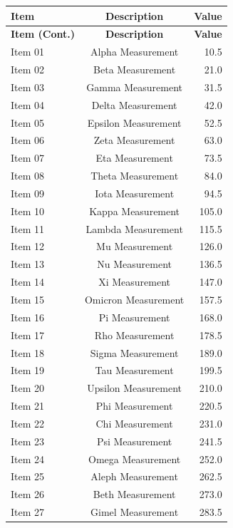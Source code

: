 \documentclass{article}
\begin{document}
\begin{longtable}{|l|c|r|}
\hline
\textbf{Item} & \textbf{Description} & \textbf{Value} \\
\hline
\endfirsthead
\hline
\textbf{Item (Cont.)} & \textbf{Description} & \textbf{Value} \\
\hline
\endhead
\hline
Item 01 & Alpha Measurement & 10.5 \\ \hline
Item 02 & Beta Measurement & 21.0 \\ \hline
Item 03 & Gamma Measurement & 31.5 \\ \hline
Item 04 & Delta Measurement & 42.0 \\ \hline
Item 05 & Epsilon Measurement & 52.5 \\ \hline
Item 06 & Zeta Measurement & 63.0 \\ \hline
Item 07 & Eta Measurement & 73.5 \\ \hline
Item 08 & Theta Measurement & 84.0 \\ \hline
Item 09 & Iota Measurement & 94.5 \\ \hline
Item 10 & Kappa Measurement & 105.0 \\ \hline
Item 11 & Lambda Measurement & 115.5 \\ \hline
Item 12 & Mu Measurement & 126.0 \\ \hline
Item 13 & Nu Measurement & 136.5 \\ \hline
Item 14 & Xi Measurement & 147.0 \\ \hline
Item 15 & Omicron Measurement & 157.5 \\ \hline
Item 16 & Pi Measurement & 168.0 \\ \hline
Item 17 & Rho Measurement & 178.5 \\ \hline
Item 18 & Sigma Measurement & 189.0 \\ \hline
Item 19 & Tau Measurement & 199.5 \\ \hline
Item 20 & Upsilon Measurement & 210.0 \\ \hline
Item 21 & Phi Measurement & 220.5 \\ \hline
Item 22 & Chi Measurement & 231.0 \\ \hline
Item 23 & Psi Measurement & 241.5 \\ \hline
Item 24 & Omega Measurement & 252.0 \\ \hline
Item 25 & Aleph Measurement & 262.5 \\ \hline
Item 26 & Beth Measurement & 273.0 \\ \hline
Item 27 & Gimel Measurement & 283.5 \\ \hline

\end{longtable}
\end{document}
